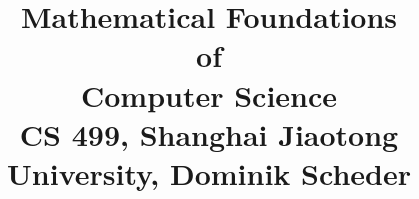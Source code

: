 \newcommand{\N}{\mathbb{N}}
\newcommand{\nn}{\mathbb{N}_0^n}
\newcommand{\R}{\mathbb{R}}
\newcommand{\Z}{\mathbb{Z}}




\date{}

\title{
  Mathematical Foundations \\of \\Computer Science\\
  \vspace{3mm}
{\normalsize CS 499,	Shanghai Jiaotong University,  Dominik Scheder}
}



\maketitle

%
%
